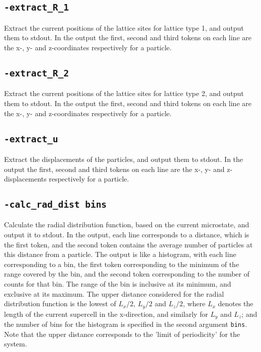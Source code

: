 \documentclass{report}
\begin{document}
\subsection{\texttt{-extract\_R\_1}}
Extract the current positions of the lattice sites for lattice type 1, and output them to stdout. In the output the first, second and third 
tokens on each line are the x-, y- and z-coordinates respectively for a particle. 

\subsection{\texttt{-extract\_R\_2}}
Extract the current positions of the lattice sites for lattice type 2, and output them to stdout. In the output the first, second and third 
tokens on each line are the x-, y- and z-coordinates respectively for a particle.

\subsection{\texttt{-extract\_u}}
Extract the displacements of the particles, and output them to stdout. In the output the first, second and third tokens on each line are 
the x-, y- and z-displacements respectively for a particle. 

\subsection{\texttt{-calc\_rad\_dist bins}}
Calculate the radial distribution function, based on the current microstate, and output it to stdout. In the output, each line corresponds 
to a distance, which is the first token, and the second token contains the average number of particles at this distance from a particle. The 
output is like a histogram, with each line corresponding to a bin, the first token corresponding to the minimum of the range covered by the 
bin, and the second token corresponding to the number of counts for that bin. The range of the bin is inclusive at its minimum, and 
exclusive at its maximum. The upper distance considered for the radial distribution function is the lowest of $L_x/2$, $L_y/2$ and $L_z/2$,
where $L_x$ denotes the length of the current supercell in the x-direction, and similarly for $L_y$ and $L_z$; and the number of bins for 
the histogram is specified in the second argument \texttt{bins}. Note that the upper distance corresponds to the 'limit of periodicity' for the system. 
\end{document}
